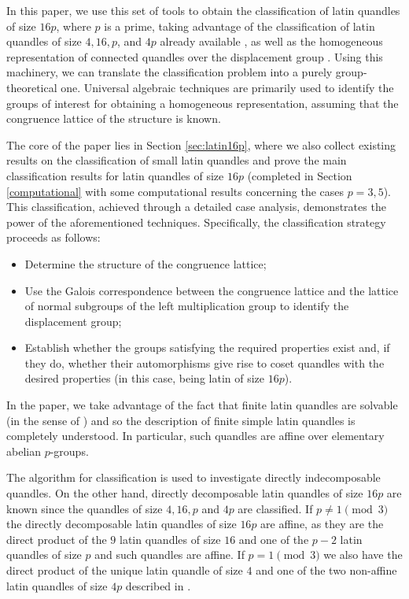 \documentclass[a4paper, english, 9pt]{amsart}
\theoremstyle{plain}
\theoremstyle{definition}
\begin{document}
In this paper, we use this set of tools to obtain the classification of latin quandles of size $16p$, where $p$ is a prime, taking advantage of the classification of latin quandles of size $4,16,p$, and $4p$ already available \cite{ESS, LSS, RIG}, as well as the homogeneous representation of connected quandles over the displacement group \cite{J}. Using this machinery, we can translate the classification problem into a purely group-theoretical one. Universal algebraic techniques are primarily used to identify the groups of interest for obtaining a homogeneous representation, assuming that the congruence lattice of the structure is known.

The core of the paper lies in Section \ref{sec:latin16p}, where we also collect existing results on the classification of small latin quandles and prove the main classification results for latin quandles of size $16p$ (completed in Section \ref{computational} with some computational results concerning the cases $p=3,5$). This classification, achieved through a detailed case analysis, demonstrates the power of the aforementioned techniques. Specifically, the classification strategy proceeds as follows:
\begin{itemize}
\item[(i)] Determine the structure of the congruence lattice;
\item[(ii)] Use the Galois correspondence between the congruence lattice and the lattice of normal subgroups of the left multiplication group to identify the displacement group;
\item[(iii)] Establish whether the groups satisfying the required properties exist and, if they do, whether their automorphisms give rise to coset quandles with the desired properties (in this case, being latin of size $16p$).
\end{itemize}
In the paper, we take advantage of the fact that finite latin quandles are solvable (in the sense of \cite{comm}) and so the description of finite simple latin quandles is completely understood. In particular, such quandles are affine over elementary abelian $p$-groups. 

The algorithm for classification is used to investigate directly indecomposable quandles. On the other hand, directly decomposable latin quandles of size $16p$ are known since the quandles of size $4,16,p$ and $4p$ are classified. If $p\neq 1\pmod{3}$ the directly decomposable latin quandles of size $16p$ are affine, as they are the direct product of the $9$ latin quandles of size $16$ and one of the $p-2$ latin quandles of size $p$ and such quandles are affine. If $p= 1\pmod{3}$ we also have the direct product of the unique latin quandle of size $4$ and one of the two non-affine latin quandles of size $4p$ described in \cite{LSS}.
\end{document}
